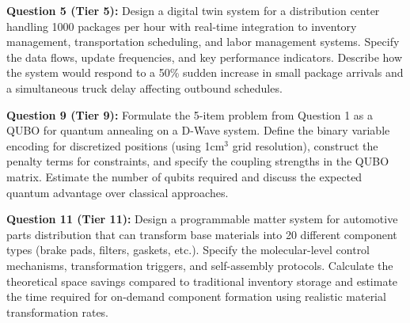 \documentclass{article}
\begin{document}
\textbf{Question 5 (Tier 5):} Design a digital twin system for a distribution center handling 1000 packages per hour with real-time integration to inventory management, transportation scheduling, and labor management systems. Specify the data flows, update frequencies, and key performance indicators. Describe how the system would respond to a 50\% sudden increase in small package arrivals and a simultaneous truck delay affecting outbound schedules.

\textbf{Question 9 (Tier 9):} Formulate the 5-item problem from Question 1 as a QUBO for quantum annealing on a D-Wave system. Define the binary variable encoding for discretized positions (using 1cm$^3$ grid resolution), construct the penalty terms for constraints, and specify the coupling strengths in the QUBO matrix. Estimate the number of qubits required and discuss the expected quantum advantage over classical approaches.

\textbf{Question 11 (Tier 11):} Design a programmable matter system for automotive parts distribution that can transform base materials into 20 different component types (brake pads, filters, gaskets, etc.). Specify the molecular-level control mechanisms, transformation triggers, and self-assembly protocols. Calculate the theoretical space savings compared to traditional inventory storage and estimate the time required for on-demand component formation using realistic material transformation rates.
\end{document}
